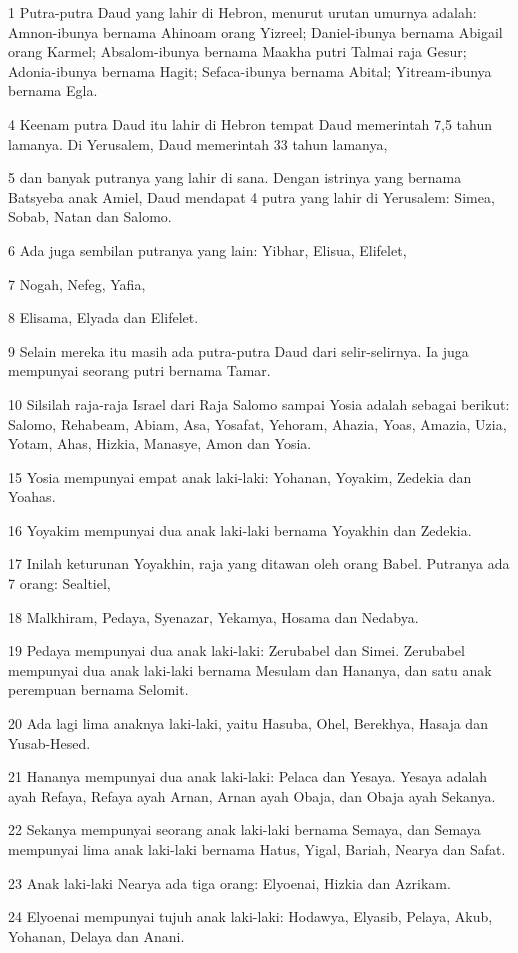 \par 1 Putra-putra Daud yang lahir di Hebron, menurut urutan umurnya adalah: Amnon-ibunya bernama Ahinoam orang Yizreel; Daniel-ibunya bernama Abigail orang Karmel; Absalom-ibunya bernama Maakha putri Talmai raja Gesur; Adonia-ibunya bernama Hagit; Sefaca-ibunya bernama Abital; Yitream-ibunya bernama Egla.
\par 4 Keenam putra Daud itu lahir di Hebron tempat Daud memerintah 7,5 tahun lamanya. Di Yerusalem, Daud memerintah 33 tahun lamanya,
\par 5 dan banyak putranya yang lahir di sana. Dengan istrinya yang bernama Batsyeba anak Amiel, Daud mendapat 4 putra yang lahir di Yerusalem: Simea, Sobab, Natan dan Salomo.
\par 6 Ada juga sembilan putranya yang lain: Yibhar, Elisua, Elifelet,
\par 7 Nogah, Nefeg, Yafia,
\par 8 Elisama, Elyada dan Elifelet.
\par 9 Selain mereka itu masih ada putra-putra Daud dari selir-selirnya. Ia juga mempunyai seorang putri bernama Tamar.
\par 10 Silsilah raja-raja Israel dari Raja Salomo sampai Yosia adalah sebagai berikut: Salomo, Rehabeam, Abiam, Asa, Yosafat, Yehoram, Ahazia, Yoas, Amazia, Uzia, Yotam, Ahas, Hizkia, Manasye, Amon dan Yosia.
\par 15 Yosia mempunyai empat anak laki-laki: Yohanan, Yoyakim, Zedekia dan Yoahas.
\par 16 Yoyakim mempunyai dua anak laki-laki bernama Yoyakhin dan Zedekia.
\par 17 Inilah keturunan Yoyakhin, raja yang ditawan oleh orang Babel. Putranya ada 7 orang: Sealtiel,
\par 18 Malkhiram, Pedaya, Syenazar, Yekamya, Hosama dan Nedabya.
\par 19 Pedaya mempunyai dua anak laki-laki: Zerubabel dan Simei. Zerubabel mempunyai dua anak laki-laki bernama Mesulam dan Hananya, dan satu anak perempuan bernama Selomit.
\par 20 Ada lagi lima anaknya laki-laki, yaitu Hasuba, Ohel, Berekhya, Hasaja dan Yusab-Hesed.
\par 21 Hananya mempunyai dua anak laki-laki: Pelaca dan Yesaya. Yesaya adalah ayah Refaya, Refaya ayah Arnan, Arnan ayah Obaja, dan Obaja ayah Sekanya.
\par 22 Sekanya mempunyai seorang anak laki-laki bernama Semaya, dan Semaya mempunyai lima anak laki-laki bernama Hatus, Yigal, Bariah, Nearya dan Safat.
\par 23 Anak laki-laki Nearya ada tiga orang: Elyoenai, Hizkia dan Azrikam.
\par 24 Elyoenai mempunyai tujuh anak laki-laki: Hodawya, Elyasib, Pelaya, Akub, Yohanan, Delaya dan Anani.

